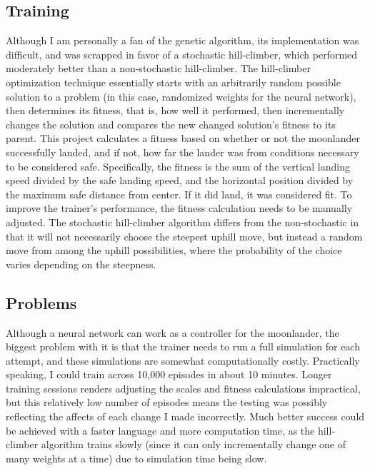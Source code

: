 \documentclass[12pt, article]{scrartcl}
\begin{document}
\subsection{Training}
Although I am personally a fan of the genetic algorithm, its implementation was difficult, and was scrapped in favor of a stochastic hill-climber, which performed moderately better than a non-stochastic hill-climber. The hill-climber optimization technique essentially starts with an arbitrarily random possible solution to a problem (in this case, randomized weights for the neural network), then determines its fitness, that is, how well it performed, then incrementally changes the solution and compares the new changed solution's fitness to its parent. This project calculates a fitness based on whether or not the moonlander successfully landed, and if not, how far the lander was from conditions necessary to be considered safe. Specifically, the fitness is the sum of the vertical landing speed divided by the safe landing speed, and the horizontal position divided by the maximum safe distance from center. If it did land, it was considered fit. To improve the trainer's performance, the fitness calculation needs to be manually adjusted. The stochastic hill-climber algorithm differs from the non-stochastic in that it will not necessarily choose the steepest uphill move, but instead a random move from among the uphill possibilities, where the probability of the choice varies depending on the steepness.

\subsection{Problems}
Although a neural network can work as a controller for the moonlander, the biggest problem with it is that the trainer needs to run a full simulation for each attempt, and these simulations are somewhat computationally costly. Practically speaking, I could train across 10,000 episodes in about 10 minutes. Longer training sessions renders adjusting the scales and fitness calculations impractical, but this relatively low number of episodes means the testing was possibly reflecting the affects of each change I made incorrectly. Much better success could be achieved with a faster language and more computation time, as the hill-climber algorithm trains slowly (since it can only incrementally change one of many weights at a time) due to simulation time being slow.
\end{document}
